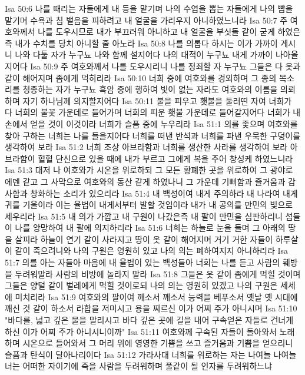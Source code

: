 Isa 50:6  나를 때리는 자들에게 내 등을 맡기며 나의 수염을 뽑는 자들에게 나의 뺨을 맡기며 수욕과 침 뱉음을 피하려고 내 얼굴을 가리우지 아니하였느니라
Isa 50:7  주 여호와께서 나를 도우시므로 내가 부끄러워 아니하고 내 얼굴을 부싯돌 같이 굳게 하였은즉 내가 수치를 당치 아니할 줄 아노라
Isa 50:8  나를 의롭다 하시는 이가 가까이 계시니 나와 다툴 자가 누구뇨 나와 함께 설지어다 나의 대적이 누구뇨 내게 가까이 나아올지어다
Isa 50:9  주 여호와께서 나를 도우시리니 나를 정죄할 자 누구뇨 그들은 다 옷과 같이 해어지며 좀에게 먹히리라
Isa 50:10  너희 중에 여호와를 경외하며 그 종의 목소리를 청종하는 자가 누구뇨 흑암 중에 행하여 빛이 없는 자라도 여호와의 이름을 의뢰하며 자기 하나님께 의지할지어다
Isa 50:11  불을 피우고 횃불을 둘러띤 자여 너희가 다 너희의 불꽃 가운데로 들어가며 너희의 피운 횃불 가운데로 들어갈지어다 너희가 내손에서 얻을 것이 이것이라 너희가 슬픔 중에 누우리라
Isa 51:1  의를 좇으며 여호와를 찾아 구하는 너희는 나를 들을지어다 너희를 떠낸 반석과 너희를 파낸 우묵한 구덩이를 생각하여 보라
Isa 51:2  너희 조상 아브라함과 너희를 생산한 사라를 생각하여 보라 아브라함이 혈혈 단신으로 있을 때에 내가 부르고 그에게 복을 주어 창성케 하였느니라
Isa 51:3  대저 나 여호와가 시온을 위로하되 그 모든 황폐한 곳을 위로하여 그 광야로 에덴 같고 그 사막으로 여호와의 동산 같게 하였나니 그 가운데 기뻐함과 즐거움과 감사함과 창화하는 소리가 있으리라
Isa 51:4  내 백성이여 내게 주의하라 내 나라여 내게 귀를 기울이라 이는 율법이 내게서부터 발할 것임이라 내가 내 공의를 만민의 빛으로 세우리라
Isa 51:5  내 의가 가깝고 내 구원이 나갔은즉 내 팔이 만민을 심판하리니 섬들이 나를 앙망하여 내 팔에 의지하리라
Isa 51:6  너희는 하늘로 눈을 들며 그 아래의 땅을 살피라 하늘이 연기 같이 사라지고 땅이 옷 같이 해어지며 거기 거한 자들이 하루살이 같이 죽으려니와 나의 구원은 영원히 있고 나의 의는 폐하여지지 아니하리라
Isa 51:7  의를 아는 자들아 마음에 내 율법이 있는 백성들아 너희는 나를 듣고 사람의 훼방을 두려워말라 사람의 비방에 놀라지 말라
Isa 51:8  그들은 옷 같이 좀에게 먹힐 것이며 그들은 양털 같이 벌레에게 먹힐 것이로되 나의 의는 영원히 있겠고 나의 구원은 세세에 미치리라
Isa 51:9  여호와의 팔이여 깨소서 깨소서 능력을 베푸소서 옛날 옛 시대에 깨신 것 같이 하소서 라합을 저미시고 용을 찌르신 이가 어찌 주가 아니시며
Isa 51:10  "바다를, 넓고 깊은 물을 말리시고 바다 깊은 곳에 길을 내어 구속얻은 자들로 건너게 하신 이가 어찌 주가 아니시니이까"
Isa 51:11  여호와께 구속된 자들이 돌아와서 노래하며 시온으로 들어와서 그 머리 위에 영영한 기쁨을 쓰고 즐거움과 기쁨을 얻으리니 슬픔과 탄식이 달아나리이다
Isa 51:12  가라사대 너희를 위로하는 자는 나여늘 나여늘 너는 어떠한 자이기에 죽을 사람을 두려워하며 풀같이 될 인자를 두려워하느냐
